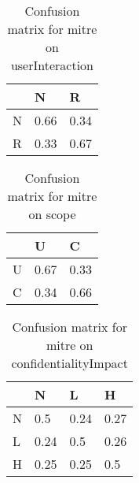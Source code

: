 \documentclass[11pt]{article}
\begin{document}
\begin{table}
	\caption{Confusion matrix for mitre on userInteraction}
	\label{table:mitre-userInteraction}
	\begin{center}
		\begin{tabular}{l|l|l}\textbf{} & \textbf{N} & \textbf{R} \\
               \hline
               N                & 0.66       & 0.34       \\
               R                & 0.33       & 0.67       \\
		\end{tabular}
	\end{center}
\end{table}


\begin{table}
	\caption{Confusion matrix for mitre on scope}
	\label{table:mitre-scope}
	\begin{center}
		\begin{tabular}{l|l|l}\textbf{} & \textbf{U} & \textbf{C} \\
               \hline
               U                & 0.67       & 0.33       \\
               C                & 0.34       & 0.66       \\
		\end{tabular}
	\end{center}
\end{table}


\begin{table}
	\caption{Confusion matrix for mitre on confidentialityImpact}
	\label{table:mitre-confidentialityImpact}
	\begin{center}
		\begin{tabular}{l|l|l|l}\textbf{} & \textbf{N} & \textbf{L} & \textbf{H} \\
               \hline
               N                  & 0.5        & 0.24       & 0.27       \\
               L                  & 0.24       & 0.5        & 0.26       \\
               H                  & 0.25       & 0.25       & 0.5        \\
		\end{tabular}
	\end{center}
\end{table}
\end{document}
